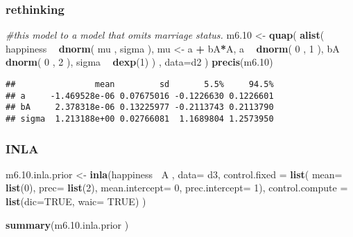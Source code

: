 \documentclass[
]{article}
\newenvironment{Shaded}{\begin{snugshade}}{\end{snugshade}}
\newcommand{\CommentTok}[1]{\textcolor[rgb]{0.56,0.35,0.01}{\textit{#1}}}
\newcommand{\DataTypeTok}[1]{\textcolor[rgb]{0.13,0.29,0.53}{#1}}
\newcommand{\DecValTok}[1]{\textcolor[rgb]{0.00,0.00,0.81}{#1}}
\newcommand{\FloatTok}[1]{\textcolor[rgb]{0.00,0.00,0.81}{#1}}
\newcommand{\KeywordTok}[1]{\textcolor[rgb]{0.13,0.29,0.53}{\textbf{#1}}}
\newcommand{\NormalTok}[1]{#1}
\newcommand{\OperatorTok}[1]{\textcolor[rgb]{0.81,0.36,0.00}{\textbf{#1}}}
\newcommand{\OtherTok}[1]{\textcolor[rgb]{0.56,0.35,0.01}{#1}}
\newcommand{\StringTok}[1]{\textcolor[rgb]{0.31,0.60,0.02}{#1}}
\begin{document}
\hypertarget{rethinking-1}{%
\subsubsection{rethinking}\label{rethinking-1}}

\begin{Shaded}
\begin{Highlighting}[]
\CommentTok{#this model to a model that omits marriage status.}
\NormalTok{m6}\FloatTok{.10}\NormalTok{ <-}\StringTok{ }\KeywordTok{quap}\NormalTok{(}
    \KeywordTok{alist}\NormalTok{(}
\NormalTok{        happiness }\OperatorTok{~}\StringTok{ }\KeywordTok{dnorm}\NormalTok{( mu , sigma ),}
\NormalTok{        mu <-}\StringTok{ }\NormalTok{a }\OperatorTok{+}\StringTok{ }\NormalTok{bA}\OperatorTok{*}\NormalTok{A,}
\NormalTok{        a }\OperatorTok{~}\StringTok{ }\KeywordTok{dnorm}\NormalTok{( }\DecValTok{0}\NormalTok{ , }\DecValTok{1}\NormalTok{ ),}
\NormalTok{        bA }\OperatorTok{~}\StringTok{ }\KeywordTok{dnorm}\NormalTok{( }\DecValTok{0}\NormalTok{ , }\DecValTok{2}\NormalTok{ ),}
\NormalTok{        sigma }\OperatorTok{~}\StringTok{ }\KeywordTok{dexp}\NormalTok{(}\DecValTok{1}\NormalTok{)}
\NormalTok{    ) , }\DataTypeTok{data=}\NormalTok{d2 )}
\KeywordTok{precis}\NormalTok{(m6}\FloatTok{.10}\NormalTok{)}
\end{Highlighting}
\end{Shaded}

\begin{verbatim}
##                mean         sd       5.5%     94.5%
## a     -1.469528e-06 0.07675016 -0.1226630 0.1226601
## bA     2.378318e-06 0.13225977 -0.2113743 0.2113790
## sigma  1.213188e+00 0.02766081  1.1689804 1.2573950
\end{verbatim}

\hypertarget{inla-1}{%
\subsubsection{INLA}\label{inla-1}}

\begin{Shaded}
\begin{Highlighting}[]
\NormalTok{m6.}\FloatTok{10.}\NormalTok{inla.prior <-}\StringTok{ }\KeywordTok{inla}\NormalTok{(happiness}\OperatorTok{~}\StringTok{ }\NormalTok{A , }\DataTypeTok{data=}\NormalTok{ d3, }
                        \DataTypeTok{control.fixed =} \KeywordTok{list}\NormalTok{(}
        \DataTypeTok{mean=} \KeywordTok{list}\NormalTok{(}\DecValTok{0}\NormalTok{), }
        \DataTypeTok{prec=} \KeywordTok{list}\NormalTok{(}\DecValTok{2}\NormalTok{),}
        \DataTypeTok{mean.intercept=} \DecValTok{0}\NormalTok{, }
        \DataTypeTok{prec.intercept=} \DecValTok{1}\NormalTok{),}
        \DataTypeTok{control.compute =} \KeywordTok{list}\NormalTok{(}\DataTypeTok{dic=}\OtherTok{TRUE}\NormalTok{, }\DataTypeTok{waic=} \OtherTok{TRUE}\NormalTok{)}
\NormalTok{)}

\KeywordTok{summary}\NormalTok{(m6.}\FloatTok{10.}\NormalTok{inla.prior )}
\end{Highlighting}
\end{Shaded}
\end{document}
